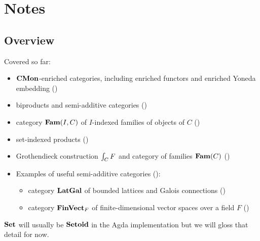 \section{Notes}

\subsection{Overview}

Covered so far:
\begin{itemize}
\item $\mathbf{CMon}$-enriched categories, including enriched functors and enriched Yoneda embedding ()
\item biproducts and semi-additive categories ()
\item category $\mathbf{Fam}(I,C)$ of $I$-indexed families of objects of $C$ ()
\item set-indexed products ()
\item Grothendieck construction $\int_{C}F$ and category of families $\mathbf{Fam}(C)$ ()
\item Examples of useful semi-additive categories ():
   \begin{itemize}
   \item category $\mathbf{LatGal}$ of bounded lattices and Galois connections ()
   \item category $\mathbf{FinVect}_F$ of finite-dimensional vector spaces over a field $F$
   ()
   \end{itemize}
\end{itemize}

\noindent $\mathbf{Set}$ will usually be $\mathbf{Setoid}$ in the Agda implementation but we will gloss that detail for now.









% 
